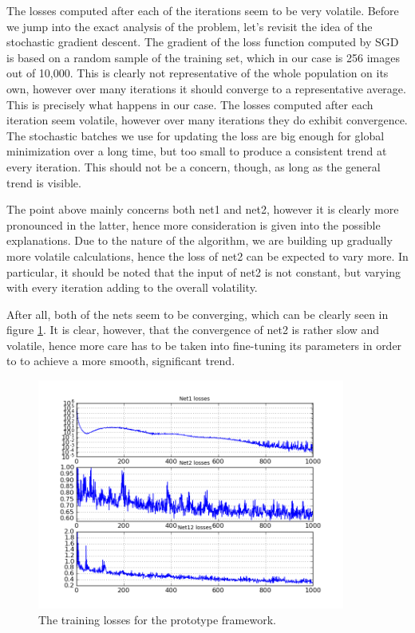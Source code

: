 \documentclass[a4paper, 11pt]{article}
\numberwithin{equation}{section}
\begin{document}
	The losses computed after each of the iterations seem to be very volatile. Before we jump into the exact analysis of the problem, let's revisit the idea of the stochastic gradient descent. The gradient of the loss function computed by SGD is based on a random sample of the training set, which in our case is 256 images out of 10,000. This is clearly not representative of the whole population on its own, however over many iterations it should converge to a representative average. This is precisely what happens in our case. The losses computed after each iteration seem volatile, however over many iterations they do exhibit convergence. The stochastic batches we use for updating the loss are big enough for global minimization over a long time, but too small to produce a consistent trend at every iteration. This should not be a concern, though, as long as the general trend is visible.
	
	The point above mainly concerns both net1 and net2, however it is clearly more pronounced in the latter, hence more consideration is given into the possible explanations. Due to the nature of the algorithm, we are building up gradually more volatile calculations, hence the loss of net2 can be expected to vary more. In particular, it should be noted that the input of net2 is not constant, but varying with every iteration adding to the overall volatility.
	
	After all, both of the nets seem to be converging, which can be clearly seen in figure \ref{fig:losses}. It is clear, however, that the convergence of net2 is rather slow and volatile, hence more care has to be taken into fine-tuning its parameters in order to to achieve a more smooth, significant trend.
	
	\begin{figure}[!h]
		\centering
		\includegraphics[page=1,width=0.9\textwidth]{losses.png}
		\caption{\label{fig:losses}{The training losses for the prototype framework.}}
	\end{figure}
	
	\newpage
	
	\clearpage
	
	\newpage
	\pagestyle{plain}
	
	
	
	
\end{document}
